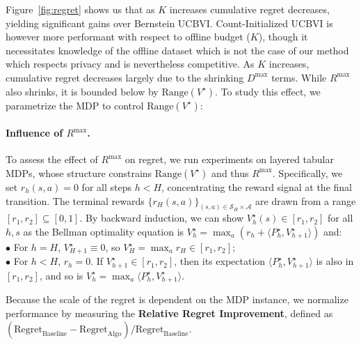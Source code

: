 \documentclass[twoside]{article}
\begin{document}
Figure~\ref{fig:regret} shows us that as $K$ increases cumulative regret decreases, yielding significant gains over Bernstein UCBVI. Count-Initialized UCBVI is however more performant with respect to offline budget ($K$), though it necessitates knowledge of the offline dataset which is not the case of our method which respects privacy and is nevertheless competitive. As $K$ increases, cumulative regret decreases largely due to the shrinking $D^{\max}$ terms. While $R^{\max}$ also shrinks, it is bounded below by $\mathrm{Range}(V^\star)$. To study this effect, we parametrize the MDP to control $\mathrm{Range}(V^\star)$:

\paragraph{Influence of $R^{\max}$.}
To assess the effect of $R^{\max}$ on regret, we run experiments on layered tabular MDPs, whose structure constrains $\mathrm{Range}(V^\star)$ and thus $R^{\max}$. Specifically, we set $r_h(s,a) = 0$ for all steps $h < H$, concentrating the reward signal at the final transition. The terminal rewards $\{r_{H}(s,a)\}_{(s,a){\in} \mathcal{S}_{H}\times\mathcal{A}}$ are drawn from a range $[r_1, r_2] {\subseteq} [0,1]$. By backward induction, we can show $V_h^\star(s){\in}[r_1,r_2]$ for all $h,s$ as the Bellman optimality equation is $V_h^\star {=}\max_a (r_h + \langle P^{\star}_h,  V_{h+1}^\star\rangle)$ and:\\
$\bullet$ For $h=H$, $V_{H+1}^\star \equiv 0$, so $V_H^\star{=} \max_a r_H \in [r_1,r_2]$;
\vspace{4pt} \\
$\bullet$ For $h{<}H$, $r_h{=} 0$. If $V_{h+1}^\star{\in}[r_1,r_2]$, then its expectation $\langle P^{\star}_h,  V_{h+1}^\star\rangle$ is also in $[r_1,r_2]$, and so is $V_h^\star {=} \max_a \langle P^{\star}_h,  V_{h+1}^\star\rangle$.

Because the scale of the regret is dependent on the MDP instance, we normalize performance by measuring the \textbf{Relative Regret Improvement}, defined as $(\text{Regret}_{\text{Baseline}} - \text{Regret}_{\text{Algo}}) / \text{Regret}_{\text{Baseline}}$.
\end{document}
